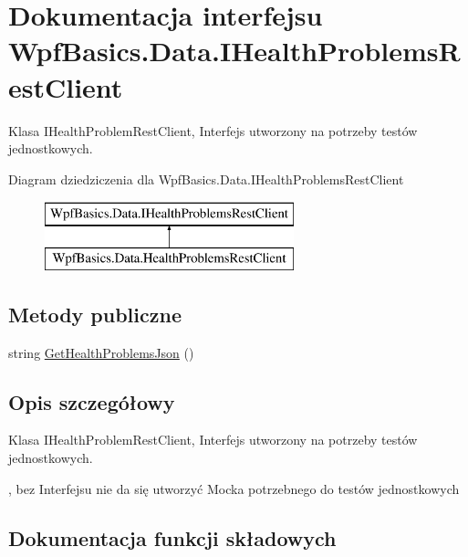 \hypertarget{interface_wpf_basics_1_1_data_1_1_i_health_problems_rest_client}{}\section{Dokumentacja interfejsu Wpf\+Basics.\+Data.\+I\+Health\+Problems\+Rest\+Client}
\label{interface_wpf_basics_1_1_data_1_1_i_health_problems_rest_client}


Klasa I\+Health\+Problem\+Rest\+Client, Interfejs utworzony na potrzeby testów jednostkowych.  


Diagram dziedziczenia dla Wpf\+Basics.\+Data.\+I\+Health\+Problems\+Rest\+Client\begin{figure}[H]
\begin{center}
\leavevmode
\includegraphics[height=2.000000cm]{interface_wpf_basics_1_1_data_1_1_i_health_problems_rest_client}
\end{center}
\end{figure}
\subsection*{Metody publiczne}
\begin{DoxyCompactItemize}
\item 
string \hyperlink{interface_wpf_basics_1_1_data_1_1_i_health_problems_rest_client_a1a7509e5e42db251942980c8a0d648d0}{Get\+Health\+Problems\+Json} ()
\end{DoxyCompactItemize}


\subsection{Opis szczegółowy}
Klasa I\+Health\+Problem\+Rest\+Client, Interfejs utworzony na potrzeby testów jednostkowych. 

, bez Interfejsu nie da się utworzyć Mocka potrzebnego do testów jednostkowych 

\subsection{Dokumentacja funkcji składowych}
\mbox{\label{interface_wpf_basics_1_1_data_1_1_i_health_problems_rest_client_a1a7509e5e42db251942980c8a0d648d0}} 
